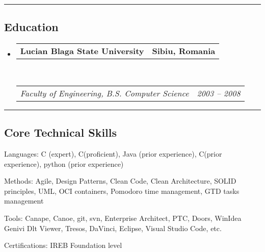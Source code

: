 \documentclass[10pt,letterpaper]{article}
\makeatletter
\newenvironment{indentsection}[1]%
{\begin{list}{}%
	{\setlength{\leftmargin}{#1}}%
	\item[]%
}
{\end{list}}
\newcommand{\headerrow}[2]
{\begin{tabular*}{\linewidth}{l@{\extracolsep{\fill}}r}
	#1 &
	#2 \\
\end{tabular*}}
\newcommand{\CPP}
{C\nolinebreak[4]\hspace{-.05em}\raisebox{.22ex}{\footnotesize\bf ++}}
\newcommand{\Csharp}
{C\nolinebreak[4]\hspace{-.05em}\raisebox{.22ex}{\footnotesize\bf \#}}
\makeatother
\begin{document}
\begin{itemize}
\end{itemize}


\hrule
\vspace{-0.4em}
\subsection*{Education}

\begin{itemize}
	\parskip=0.1em

	\item 
	\headerrow
		{\textbf{Lucian Blaga State University}}
		{\textbf{Sibiu, Romania}}
	\\
	\headerrow
		{\emph{Faculty of Engineering, B.S. Computer Science}}
		{\emph{2003 -- 2008}}

\end{itemize}


\hrule
\vspace{-0.4em}
\subsection*{Core Technical Skills}

\begin{indentsection}{\parindent}
\begin{description*}
	\item[Languages:]
	C (expert), \CPP (proficient), Java (prior experience), \Csharp (prior experience), python (prior experience)
	\item[Methods:]
	Agile, Design Patterns, Clean Code, Clean Architecture, SOLID principles, UML, OCI containers, Pomodoro time management, GTD tasks management
	\item[Tools:]
	Canape, Canoe, git, svn, Enterprise Architect, PTC, Doors, WinIdea Genivi Dlt Viewer, Tresos, DaVinci, Eclipse, Visual Studio Code, etc.
	\item[Certifications:]
	IREB Foundation level
\end{description*}
\end{indentsection}
\end{document}
